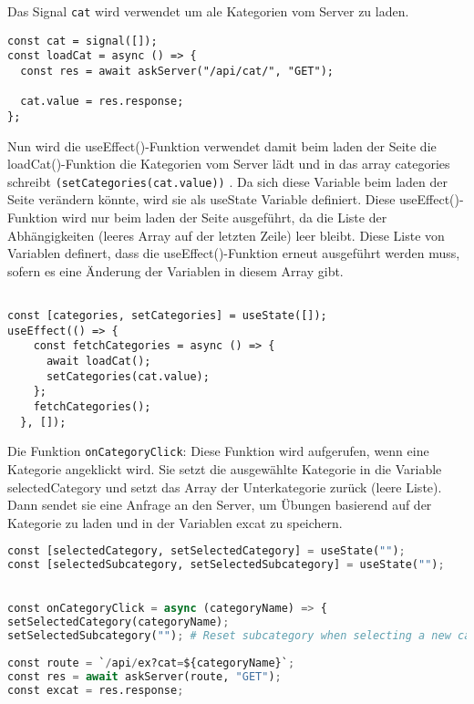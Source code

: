 Das Signal \texttt{cat} wird verwendet um ale Kategorien vom Server zu laden.

\begin{lstlisting}
const cat = signal([]);
const loadCat = async () => {
  const res = await askServer("/api/cat/", "GET");

  cat.value = res.response;
};

\end{lstlisting}

Nun wird die useEffect()-Funktion verwendet damit beim laden der Seite die loadCat()-Funktion die Kategorien vom Server lädt und in das array categories schreibt \texttt{(setCategories(cat.value))} . Da sich diese Variable beim laden der Seite verändern könnte, wird sie als useState Variable definiert. 
Diese useEffect()-Funktion wird nur beim laden der Seite ausgeführt, da die Liste der Abhängigkeiten (leeres Array auf der letzten Zeile) leer bleibt. Diese Liste von Variablen definert, dass die useEffect()-Funktion erneut ausgeführt werden muss, sofern es eine Änderung der Variablen in diesem Array gibt.
\begin{lstlisting}

const [categories, setCategories] = useState([]);
useEffect(() => {
    const fetchCategories = async () => {
      await loadCat();
      setCategories(cat.value);
    };
    fetchCategories();
  }, []);

\end{lstlisting}


Die Funktion \texttt{onCategoryClick}: Diese Funktion wird aufgerufen, wenn eine Kategorie angeklickt wird. Sie setzt die ausgewählte Kategorie in die Variable selectedCategory und setzt das Array der Unterkategorie zurück (leere Liste). Dann sendet sie eine Anfrage an den Server, um Übungen basierend auf der Kategorie zu laden und in der Variablen excat zu speichern.

\begin{lstlisting}[language=Python]
const [selectedCategory, setSelectedCategory] = useState("");
const [selectedSubcategory, setSelectedSubcategory] = useState("");


const onCategoryClick = async (categoryName) => {
setSelectedCategory(categoryName);
setSelectedSubcategory(""); # Reset subcategory when selecting a new category
    
const route = `/api/ex?cat=${categoryName}`;
const res = await askServer(route, "GET");
const excat = res.response;
    
\end{lstlisting}

